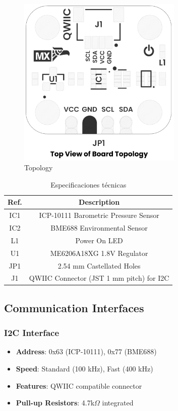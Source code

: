 \documentclass[11pt,a4paper]{article}
\begin{document}
\begin{figure}[H]
\centering
\includegraphics[width=0.7\textwidth]{en_unit_topology_v_1_0_0_icp10111_barometric_pressure_sensor.png}
\caption{Topology}
\label{fig:en-unit-topology-v-1-0-0-icp10111-barometric-pressure-sensor-png}
\end{figure}




\begin{table}[H]
\centering
\small
\begin{tabular}{|c|c|}
\hline
Ref. & Description \\
\hline
IC1 & ICP-10111 Barometric Pressure Sensor \\
IC2 & BME688 Environmental Sensor \\
L1 & Power On LED \\
U1 & ME6206A18XG 1.8V Regulator \\
JP1 & 2.54 mm Castellated Holes \\
J1 & QWIIC Connector (JST 1 mm pitch) for I2C \\
\hline
\end{tabular}
\caption{Especificaciones técnicas}
\end{table}


\subsection{Communication Interfaces}

\subsubsection{I2C Interface}
\begin{itemize}
\item \textbf{Address}: 0x63 (ICP-10111), 0x77 (BME688)
\item \textbf{Speed}: Standard (100 kHz), Fast (400 kHz)
\item \textbf{Features}: QWIIC compatible connector
\item \textbf{Pull-up Resistors}: 4.7k$\Omega$ integrated
\end{itemize}
\end{document}

